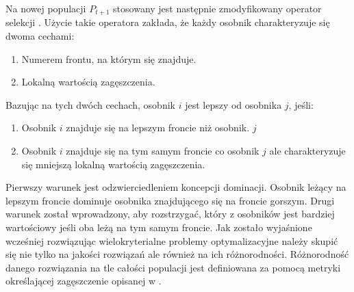 \documentclass[twoside]{iisthesis}
\begin{document}
Na nowej populacji $P_{t+1}$ stosowany jest następnie zmodyfikowany operator selekcji \cite{nsga}. Użycie takie operatora zakłada, że każdy osobnik charakteryzuje się dwoma cechami:\\
\begin{enumerate}
	\item Numerem frontu, na którym się znajduje.
	\item Lokalną wartością zagęszczenia.\\
\end{enumerate}
Bazując na tych dwóch cechach, osobnik $i$ jest lepszy od osobnika $j$, jeśli:\\
\begin{enumerate}
	\item Osobnik $i$ znajduje się na lepszym froncie niż osobnik. $j$
	\item Osobnik $i$ znajduje się na tym samym froncie co osobnik $j$ ale charakteryzuje się mniejszą lokalną wartością zagęszczenia.\\
\end{enumerate}
Pierwszy warunek jest odzwierciedleniem koncepcji dominacji. Osobnik leżący na lepszym froncie dominuje osobnika znajdującego się na froncie gorszym. Drugi warunek został wprowadzony, aby rozstrzygać, który z osobników jest bardziej wartościowy jeśli oba leżą na tym samym froncie. Jak zostało wyjaśnione wcześniej rozwiązując wielokryterialne problemy optymalizacyjne należy skupić się nie tylko na jakości rozwiązań ale również na ich różnorodności. Różnorodność danego rozwiązania na tle całości populacji jest definiowana za pomocą metryki określającej zagęszczenie opisanej w \cite{book}. 
\end{document}
